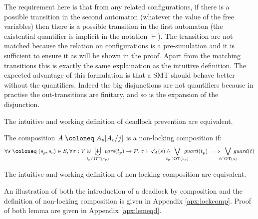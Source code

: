 \documentclass{article}
\begin{document}
The requirement here is that from any related configurations, if there is a possible transition in the second automaton (whatever the value of the free variables) then there is a possible transition in the first automaton (the existential quantifier is implicit in the notation \(\vdash\)).
The transition are not matched because the relation on configurations is a pre-simulation and it is sufficient to ensure it as will be shown in the proof.
Apart from the matching transitions this is exactly the same explaination as the intuitive definition.
The expected advantage of this formulation is that a SMT should behave better without the quantifiers.
Indeed the big disjunctions are not quantifiers because in practise the out-transitions are finitary, and so is the expansion of the disjunction. %
\begin{lem}
The intuitive and working definition of deadlock prevention are equivalent.
\end{lem}
\begin{defi}
The composition \(A \defobject A_p\subst{A_c}{j}\) is a non-locking composition if:
\[ \forall s \defobject \mpar{s_p, s_c} \in S, \forall \sigma: V \uplus \biguplus_\subbox{t_p \in \fOT{s_p}} \fvars{t_p} \to \values, \sigma \vdash \reach{A}\mpar{s} \wedge \bigvee_\subbox{t_p \in \fOT{s_p}} \fguard{t_p} \implies \bigvee_\subbox{t \in \fOT{s}} \fguard{t} \]
\end{defi}
\begin{lem}
The intuitive and working definition of non-locking composition are equivalent.
\end{lem}
An illustration of both the introduction of a deadlock by composition and the definition of non-locking composition is given in Appendix \ref{apx:lockcomp}.
Proof of both lemma are given in Appendix \ref{apx:lemeqd}.
\end{document}
